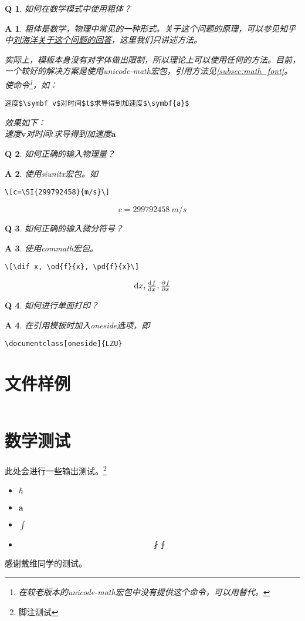 \documentclass[oneside]{LZU}
\newcommand{\bvec}[1]{\symbf{#1}}
\newcommand{\package}[1]{{\sffamily #1}}
\newtheorem*{answer}{A}
\newtheorem{question}{Q}
\begin{document}
\begin{question}
    如何在数学模式中使用粗体？
\end{question}
\begin{answer}
    粗体是数学，物理中常见的一种形式。关于这个问题的原理，可以参见知乎中\href{https://www.zhihu.com/question/25290041/answer/30422583}{刘海洋关于这个问题的回答}\supercite{mathboldfont}，这里我们只讲述方法。

    实际上，模板本身没有对字体做出限制，所以理论上可以使用任何的方法。目前，一个较好的解决方案是使用\package{unicode-math}宏包，引用方法见\cref{subsec:math_font}。使\texttt{\symbf}命令\footnote{在较老版本的\package{unicode-math}宏包中没有提供这个命令，可以用\texttt{\mathbf}替代。}，如：
\begin{verbatim}
速度$\symbf v$对时间$t$求导得到加速度$\symbf{a}$
\end{verbatim}
效果如下：\\
速度$\symbf v$对时间$t$求导得到加速度$\symbf{a}$
\end{answer}
\begin{question}
    如何正确的输入物理量？
\end{question}
\begin{answer}
    使用\package{siunitx}宏包。如
\begin{verbatim}
\[c=\SI{299792458}{m/s}\]
\end{verbatim}
    \[c=\SI{299792458}{m/s}\]
\end{answer}
\begin{question}
    如何正确的输入微分符号？
\end{question}
\begin{answer}
    使用\package{commath}宏包。
\begin{verbatim}
\[\dif x, \od{f}{x}, \pd{f}{x}\]
\end{verbatim}
    \[\dif x, \od{f}{x}, \pd{f}{x}\]
\end{answer}
\begin{question}
    如何进行单面打印？
\end{question}
\begin{answer}
    在引用模板时加入oneside选项，即
\begin{verbatim}
\documentclass[oneside]{LZU}
\end{verbatim}
\end{answer}
\section{文件样例}
\label{sec:bibtex_examples}
\inputminted[breaklines,frame=single,linenos]{bibtex}{example.bib}
\section{数学测试}
此处会进行一些输出测试。\footnote{脚注测试}
\begin{itemize}
    \item $\hbar$
    \item $\bvec{a}$
    \item $\int$
    \item \[\fint\intbar\]
\end{itemize}
\Thanks
感谢戴维同学的测试。
\Grade
\end{document}
